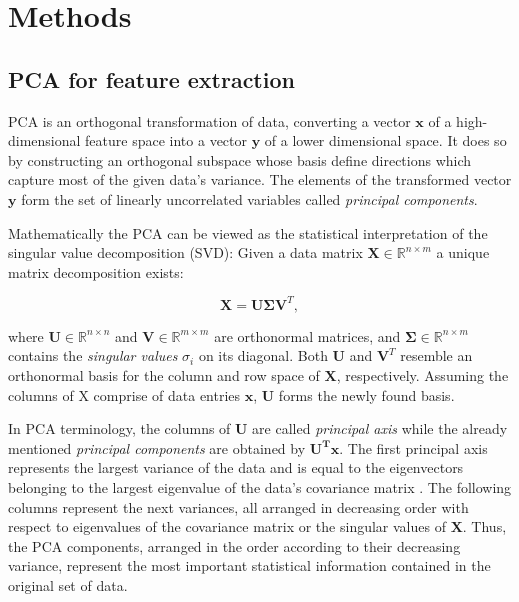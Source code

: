 \section{Methods}
\subsection{PCA for feature extraction}

PCA is an orthogonal transformation of data, converting a vector $\mathbf{x}$ of
a high-dimensional feature space into a vector $\mathbf{y}$ of a lower
dimensional space. It does so by constructing an orthogonal subspace whose basis
define directions which capture most of the given data's variance. The elements
of the transformed vector $\mathbf{y}$ form the set of linearly uncorrelated
variables called \textit{principal components}. 

Mathematically the PCA can be viewed as the statistical interpretation of the
singular value decomposition (SVD): Given a data matrix
$\mathbf{X}\in\mathbb{R}^{n\times m}$ a unique matrix decomposition exists:

\begin{equation}
  \mathbf{X} = \mathbf{U \Sigma V}^T,
\end{equation}

where $\mathbf{U}\in\mathbb{R}^{n\times n}$ and
$\mathbf{V}\in\mathbb{R}^{m\times m}$ are orthonormal matrices, and
$\mathbf{\Sigma}\in \mathbb{R}^{n\times m}$ contains the \textit{singular
values} $\sigma_i$ on its diagonal. Both $\mathbf{U}$ and $\mathbf{V}^T$
resemble an orthonormal basis for the column and row space of $\mathbf{X}$,
respectively. Assuming the columns of X comprise of data entries $\mathbf{x}$,
$\mathbf{U}$ forms the newly found basis.  

In PCA terminology, the columns of $\mathbf{U}$ are called \textit{principal
axis} while the already mentioned \textit{principal components} are obtained by
$\mathbf{U^Tx}$. The first principal axis represents the largest variance of the
data and is equal to the eigenvectors belonging to the largest eigenvalue of the
data's covariance matrix \footnotemark. The following columns represent the next
variances, all arranged in decreasing order with respect to eigenvalues of the
covariance matrix or the singular values of $\mathbf{X}$. Thus, the PCA
components, arranged in the order according to their decreasing variance,
represent the most important statistical information contained in the original
set of data. 

